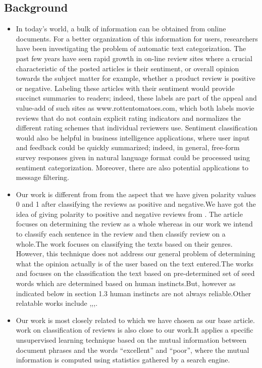\documentclass{article}
\begin{document}
\subsection{Background}
\begin{itemize}
    \item In today's world, a bulk of information can be obtained from online documents. For a better organization of this information for users, researchers have been investigating the problem of automatic text categorization. The past few years have seen rapid growth in on-line review sites where a crucial characteristic of the posted articles is their sentiment, or overall opinion towards the subject matter  for example, whether a product review is positive or negative. Labeling these articles with their sentiment would provide succinct summaries to readers; indeed, these labels are part of the appeal and value-add of such sites as www.rottentomatoes.com, which both labels movie reviews that do not contain explicit rating indicators and normalizes the different rating schemes that individual reviewers use. Sentiment classification would also be helpful in business intelligence applications, where user input and feedback could be quickly summarized; indeed, in general, free-form survey responses given in natural language format could be processed using sentiment categorization. Moreover, there are also potential applications to message filtering. 
    
    \item Our work is different from \cite{r_1} from the aspect that we have given polarity values 0 and 1 after classifying the reviews as positive and negative.We have got the idea of giving polarity to positive and negative reviews from \cite{r_2}. The article \cite{r_3} focuses on determining the review as a whole whereas in our work we intend to classify each sentence in the review and then classify review on a whole.The work \cite{r_4} focuses on classifying the texts based on their genres. However, this technique does not address our general problem of determining what the opinion actually is of the user based on the text entered.The works \cite{r_5} and \cite{r_6} focuses on the classification the text based on pre-determined set of seed words which are determined based on human instincts.But, however as indicated below in section 1.3 human instincts are not always reliable.Other relatable works include \cite{r_7},\cite{r_8},\cite{r_9},\cite{r_10}.

    \item Our work is most closely related to \cite{Base} which we have chosen as our base article. \cite{cr_1} work on classiﬁcation of reviews is also close to our work.It applies a speciﬁc unsupervised learning technique based on the mutual information between document phrases and the words “excellent” and “poor”, where the mutual information is computed using statistics gathered by a search engine. 
\end{itemize}
\end{document}
